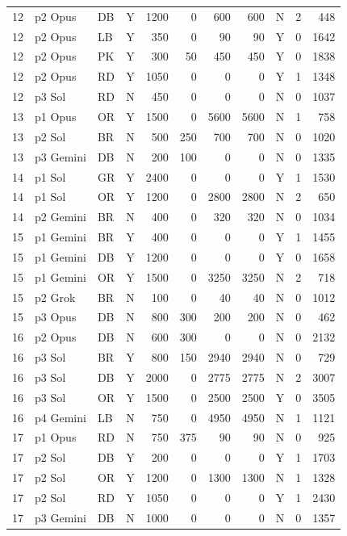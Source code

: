 \begin{longtable}{r l l l r r r r l r r}
12 & p2 Opus & DB & Y & 1200 & 0 & 600 & 600 & N & 2 & 448 \\
12 & p2 Opus & LB & Y & 350 & 0 & 90 & 90 & Y & 0 & 1642 \\
12 & p2 Opus & PK & Y & 300 & 50 & 450 & 450 & Y & 0 & 1838 \\
12 & p2 Opus & RD & Y & 1050 & 0 & 0 & 0 & Y & 1 & 1348 \\
12 & p3 Sol & RD & N & 450 & 0 & 0 & 0 & N & 0 & 1037 \\
13 & p1 Opus & OR & Y & 1500 & 0 & 5600 & 5600 & N & 1 & 758 \\
13 & p2 Sol & BR & N & 500 & 250 & 700 & 700 & N & 0 & 1020 \\
13 & p3 Gemini & DB & N & 200 & 100 & 0 & 0 & N & 0 & 1335 \\
14 & p1 Sol & GR & Y & 2400 & 0 & 0 & 0 & Y & 1 & 1530 \\
14 & p1 Sol & OR & Y & 1200 & 0 & 2800 & 2800 & N & 2 & 650 \\
14 & p2 Gemini & BR & N & 400 & 0 & 320 & 320 & N & 0 & 1034 \\
15 & p1 Gemini & BR & Y & 400 & 0 & 0 & 0 & Y & 1 & 1455 \\
15 & p1 Gemini & DB & Y & 1200 & 0 & 0 & 0 & Y & 0 & 1658 \\
15 & p1 Gemini & OR & Y & 1500 & 0 & 3250 & 3250 & N & 2 & 718 \\
15 & p2 Grok & BR & N & 100 & 0 & 40 & 40 & N & 0 & 1012 \\
15 & p3 Opus & DB & N & 800 & 300 & 200 & 200 & N & 0 & 462 \\
16 & p2 Opus & DB & N & 600 & 300 & 0 & 0 & N & 0 & 2132 \\
16 & p3 Sol & BR & Y & 800 & 150 & 2940 & 2940 & N & 0 & 729 \\
16 & p3 Sol & DB & Y & 2000 & 0 & 2775 & 2775 & N & 2 & 3007 \\
16 & p3 Sol & OR & Y & 1500 & 0 & 2500 & 2500 & Y & 0 & 3505 \\
16 & p4 Gemini & LB & N & 750 & 0 & 4950 & 4950 & N & 1 & 1121 \\
17 & p1 Opus & RD & N & 750 & 375 & 90 & 90 & N & 0 & 925 \\
17 & p2 Sol & DB & Y & 200 & 0 & 0 & 0 & Y & 1 & 1703 \\
17 & p2 Sol & OR & Y & 1200 & 0 & 1300 & 1300 & N & 1 & 1328 \\
17 & p2 Sol & RD & Y & 1050 & 0 & 0 & 0 & Y & 1 & 2430 \\
17 & p3 Gemini & DB & N & 1000 & 0 & 0 & 0 & N & 0 & 1357 \\

\end{longtable}
